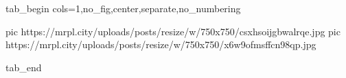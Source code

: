  
 
 
 
 


\ifcmt
  tab_begin cols=1,no_fig,center,separate,no_numbering

     pic https://mrpl.city/uploads/posts/resize/w/750x750/csxhsoijgbwalrqe.jpg
     pic https://mrpl.city/uploads/posts/resize/w/750x750/x6w9ofmsffcn98qp.jpg

  tab_end
\fi
